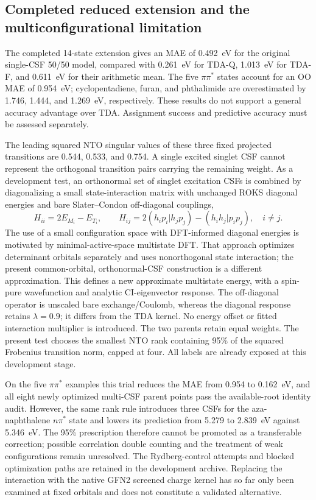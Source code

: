\subsection{Completed reduced extension and the multiconfigurational limitation}

The completed 14-state extension gives an MAE of 0.492~eV for the original single-CSF 50/50 model, compared with 0.261~eV for TDA-Q, 1.013~eV for TDA-F, and 0.611~eV for their arithmetic mean. The five $\pi\pi^*$ states account for an OO MAE of 0.954~eV; cyclopentadiene, furan, and phthalimide are overestimated by 1.746, 1.444, and 1.269~eV, respectively. These results do not support a general accuracy advantage over TDA. Assignment success and predictive accuracy must be assessed separately.

The leading squared NTO singular values of these three fixed projected transitions are 0.544, 0.533, and 0.754. A single excited singlet CSF cannot represent the orthogonal transition pairs carrying the remaining weight. As a development test, an orthonormal set of singlet excitation CSFs is combined by diagonalizing a small state-interaction matrix with unchanged ROKS diagonal energies and bare Slater--Condon off-diagonal couplings,
\begin{equation}
 H_{ii}=2E_{M_i}-E_{T_i},\qquad
 H_{ij}=2(h_ip_i|h_jp_j)-(h_ih_j|p_ip_j),\quad i\ne j.
\end{equation}
The use of a small configuration space with DFT-informed diagonal energies is motivated by minimal-active-space multistate DFT.\cite{masmsdft2021} That approach optimizes determinant orbitals separately and uses nonorthogonal state interaction; the present common-orbital, orthonormal-CSF construction is a different approximation. This defines a new approximate multistate energy, with a spin-pure wavefunction and analytic CI-eigenvector response. The off-diagonal operator is unscaled bare exchange/Coulomb, whereas the diagonal response retains $\lambda=0.9$; it differs from the TDA kernel. No energy offset or fitted interaction multiplier is introduced. The two parents retain equal weights. The present test chooses the smallest NTO rank containing 95\% of the squared Frobenius transition norm, capped at four. All labels are already exposed at this development stage.


On the five $\pi\pi^*$ examples this trial reduces the MAE from 0.954 to 0.162~eV, and all eight newly optimized multi-CSF parent points pass the available-root identity audit. However, the same rank rule introduces three CSFs for the aza-naphthalene $n\pi^*$ state and lowers its prediction from 5.279 to 2.839~eV against 5.346~eV. The 95\% prescription therefore cannot be promoted as a transferable correction; possible correlation double counting and the treatment of weak configurations remain unresolved. The Rydberg-control attempts and blocked optimization paths are retained in the development archive. Replacing the interaction with the native GFN2 screened charge kernel has so far only been examined at fixed orbitals and does not constitute a validated alternative.

